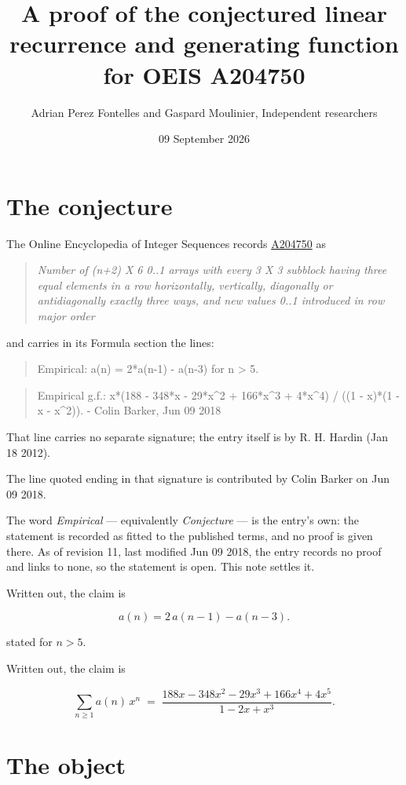 \documentclass[11pt]{article}
\title{A proof of the conjectured linear recurrence and generating function for OEIS A204750}
\author{Adrian Perez Fontelles and Gaspard Moulinier, Independent researchers}
\date{09 September 2026}
\theoremstyle{definition}
\begin{document}
\maketitle
\section{The conjecture}

The Online Encyclopedia of Integer Sequences records \href{https://oeis.org/A204750}{A204750} as

\begin{quote}\itshape Number of (n+2) X 6 0..1 arrays with every 3 X 3 subblock having three equal elements in a row horizontally, vertically, diagonally or antidiagonally exactly three ways, and new values 0..1 introduced in row major order\end{quote}

and carries in its Formula section the lines:

\begin{quote}\ttfamily Empirical: a(n) = 2*a(n-1) - a(n-3) for n > 5.\end{quote}

\begin{quote}\ttfamily Empirical g.f.: x*(188 - 348*x - 29*x\textasciicircum{}2 + 166*x\textasciicircum{}3 + 4*x\textasciicircum{}4) / ((1 - x)*(1 - x - x\textasciicircum{}2)). - Colin Barker, Jun 09 2018\end{quote}

That line carries no separate signature; the entry itself is by R. H. Hardin (Jan 18 2012).

The line quoted ending in that signature is contributed by Colin Barker on Jun 09 2018.

The word {\itshape Empirical} --- equivalently {\itshape Conjecture} --- is the entry's own: the statement is recorded as fitted to the published terms, and no proof is given there. As of revision 11, last modified Jun 09 2018, the entry records no proof and links to none, so the statement is open. This note settles it.

Written out, the claim is

\[a(n) = 2\,a(n-1) - a(n-3).\]

stated for $n > 5$.

Written out, the claim is

\[\sum_{n \ge 1} a(n)\,x^n \;=\; \frac{188x - 348x^{2} - 29x^{3} + 166x^{4} + 4x^{5}}{1 - 2x + x^{3}}.\]

\section{The object}
\end{document}
